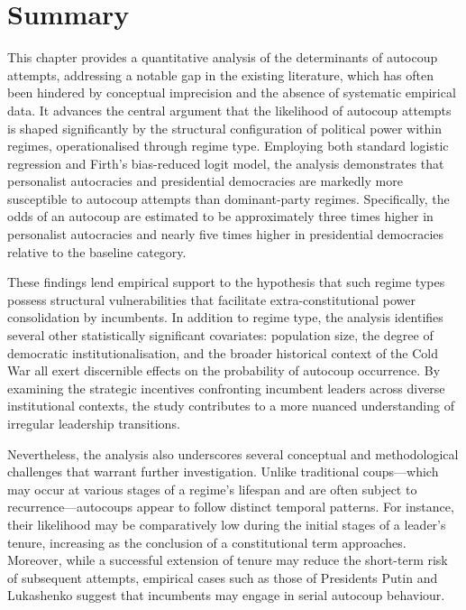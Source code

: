 \documentclass[
  12pt,
]{report}
\begin{document}
\section{Summary}\label{summary-1}

This chapter provides a quantitative analysis of the determinants of
autocoup attempts, addressing a notable gap in the existing literature,
which has often been hindered by conceptual imprecision and the absence
of systematic empirical data. It advances the central argument that the
likelihood of autocoup attempts is shaped significantly by the
structural configuration of political power within regimes,
operationalised through regime type. Employing both standard logistic
regression and Firth's bias-reduced logit model, the analysis
demonstrates that personalist autocracies and presidential democracies
are markedly more susceptible to autocoup attempts than dominant-party
regimes. Specifically, the odds of an autocoup are estimated to be
approximately three times higher in personalist autocracies and nearly
five times higher in presidential democracies relative to the baseline
category.

These findings lend empirical support to the hypothesis that such regime
types possess structural vulnerabilities that facilitate
extra-constitutional power consolidation by incumbents. In addition to
regime type, the analysis identifies several other statistically
significant covariates: population size, the degree of democratic
institutionalisation, and the broader historical context of the Cold War
all exert discernible effects on the probability of autocoup occurrence.
By examining the strategic incentives confronting incumbent leaders
across diverse institutional contexts, the study contributes to a more
nuanced understanding of irregular leadership transitions.

Nevertheless, the analysis also underscores several conceptual and
methodological challenges that warrant further investigation. Unlike
traditional coups---which may occur at various stages of a regime's
lifespan and are often subject to recurrence---autocoups appear to
follow distinct temporal patterns. For instance, their likelihood may be
comparatively low during the initial stages of a leader's tenure,
increasing as the conclusion of a constitutional term approaches.
Moreover, while a successful extension of tenure may reduce the
short-term risk of subsequent attempts, empirical cases such as those of
Presidents Putin and Lukashenko suggest that incumbents may engage in
serial autocoup behaviour.
\end{document}
